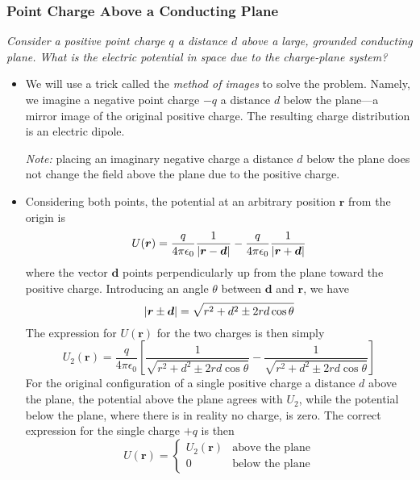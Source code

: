 \documentclass[11pt, a4paper]{article}
\renewcommand{\vec}[1]{\bm{#1}} %
\renewcommand{\r}{\vec{r}}
\newcommand{\ee}{\epsilon_{0}}  %
\begin{document}
\subsubsection{Point Charge Above a Conducting Plane}
\textit{Consider a positive point charge $ q $ a distance $ d $ above a large, grounded conducting plane. What is the electric potential in space due to the charge-plane system?}
\begin{itemize}
	\item We will use a trick called the \textit{method of images} to solve the problem. 
	Namely, we imagine a negative point charge $ -q $ a distance $ d $ below the plane---a mirror image of the original positive charge. The resulting charge distribution is an electric dipole. 
	
	\textit{Note:} placing an imaginary negative charge a distance $ d $ below the plane does not change the field above the plane due to the positive charge. 
	
	\item Considering both points, the potential at an arbitrary position $ \r $ from the origin is
	\begin{equation*}
		U(\r) = \frac{q}{4\pi \ee}\frac{1}{\abs{\r - \vec{d}}} - \frac{q}{4\pi \ee}\frac{1}{\abs{\r + \vec{d}}} 
	\end{equation*}
	where the vector $ \vec{d} $ points perpendicularly up from the plane toward the positive charge. Introducing an angle $ \theta $ between $ \vec{d} $ and $ \r $, we have
	\begin{equation*}
		\abs{\r \pm \vec{d}} = \sqrt{r^{2}+d^{2} \pm 2rd\cos \theta}
	\end{equation*}
	The expression for $ U(\r) $ for the two charges is then simply
	\begin{equation*}
		U_{2}(\r) = \frac{q}{4\pi \ee}\left[\frac{1}{\sqrt{r^{2}+d^{2} \pm 2rd\cos \theta}} - \frac{1}{\sqrt{r^{2}+d^{2} \pm 2rd\cos \theta}}\right]
	\end{equation*}
	For the original configuration of a single positive charge a distance $ d $ above the plane, the potential above the plane agrees with $ U_{2} $, while the potential below the plane, where there is in reality no charge, is zero. The correct expression for the single charge $ +q $ is then
	\begin{equation*}
		U(\r) = 
		\begin{cases}
			U_{2}(\r) & \text{above the plane}\\
			0 & \text{below the plane}
		\end{cases}
	\end{equation*}
	

\end{itemize}
\end{document}

